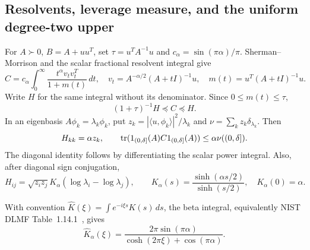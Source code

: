 \subsection{Resolvents, leverage measure, and the uniform degree-two upper}
For $A\succ0$, $B=A+uu^T$, set $\tau=u^TA^{-1}u$ and
$c_\alpha=\sin(\pi\alpha)/\pi$. Sherman--Morrison and the scalar
fractional resolvent integral give
\begin{equation}\label{deg:eq:res}
 C=c_\alpha\int_0^\infty
 \frac{t^\alpha v_tv_t^T}{1+m(t)}\,dt,\quad
 v_t=A^{-\alpha/2}(A+tI)^{-1}u,\quad
 m(t)=u^T(A+tI)^{-1}u.
\end{equation}
Write $H$ for the same integral without its denominator. Since
$0\le m(t)\le\tau$,
\begin{equation}\label{deg:eq:sandwich}
 (1+\tau)^{-1}H\preceq C\preceq H.
\end{equation}
In an eigenbasis $A\phi_k=\lambda_k\phi_k$, put
$z_k=|\langle u,\phi_k\rangle|^2/\lambda_k$ and
$\nu=\sum_kz_k\delta_{\lambda_k}$. Then
\begin{equation}\label{deg:eq:diag}
 H_{kk}=\alpha z_k,\qquad
 \operatorname{tr}(1_{(0,\delta]}(A)C1_{(0,\delta]}(A))
                                      \le\alpha\nu((0,\delta]).
\end{equation}
The diagonal identity follows by differentiating the scalar power
integral. Also, after diagonal sign conjugation,
\begin{equation}\label{deg:eq:kernel}
 H_{ij}=\sqrt{z_iz_j}K_\alpha(\log\lambda_i-\log\lambda_j),\qquad
 K_\alpha(s)=\frac{\sinh(\alpha s/2)}{\sinh(s/2)},\quad K_\alpha(0)=\alpha.
\end{equation}

With convention $\widehat K(\xi)=\int e^{-i\xi s}K(s)\,ds$, the beta
integral, equivalently NIST DLMF Table~1.14.1~\cite{DLMF}, gives
\begin{equation}\label{deg:eq:symbol}
 \widehat K_\alpha(\xi)=
 \frac{2\pi\sin(\pi\alpha)}{\cosh(2\pi\xi)+\cos(\pi\alpha)}.
\end{equation}


